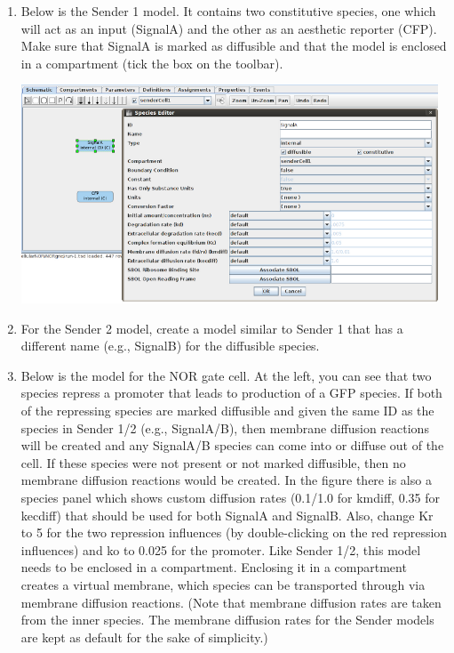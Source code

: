 \documentclass[titlepage,11pt]{article}
\begin{document}
\begin{enumerate}

\item Below is the Sender 1 model.  It contains two constitutive species, one which will act as an input (SignalA) and the other as an aesthetic reporter (CFP).  Make sure that SignalA is marked as diffusible and that the model is enclosed in a compartment (tick the box on the toolbar).

\includegraphics[height=65mm]{screenshots/sender1}

\item For the Sender 2 model, create a model similar to Sender 1 that has a different name (e.g., SignalB) for the diffusible species.

\item Below is the model for the NOR gate cell.  At the left, you can see that two species repress a promoter that leads to production of a GFP species.  If both of the repressing species are marked diffusible and given the same ID as the species in Sender 1/2 (e.g., SignalA/B), then membrane diffusion reactions will be created and any SignalA/B species can come into or diffuse out of the cell.  If these species were not present or not marked diffusible, then no membrane diffusion reactions would be created.  In the figure there is also a species panel which shows custom diffusion rates (0.1/1.0 for kmdiff, 0.35 for kecdiff) that should be used for both SignalA and SignalB.  Also, change Kr to 5 for the two repression influences (by double-clicking on the red repression influences) and ko to 0.025 for the promoter.  Like Sender 1/2, this model needs to be enclosed in a compartment.  Enclosing it in a compartment creates a virtual membrane, which species can be transported through via membrane diffusion reactions.  (Note that membrane diffusion rates are taken from the inner species.  The membrane diffusion rates for the Sender models are kept as default for the sake of simplicity.)


\end{enumerate}
\end{document}
